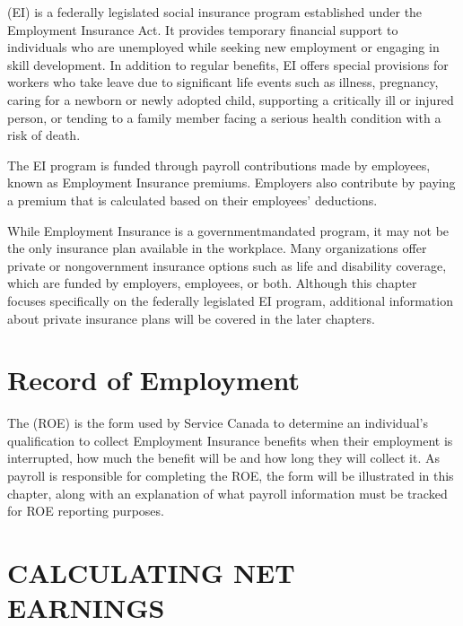 \documentclass[letterpaper,10pt,english]{sphinxmanual}
\begin{document}
\sphinxAtStartPar
{} (EI) is a federally legislated social insurance program established under the Employment Insurance Act.
It provides temporary financial support to individuals who are unemployed while seeking new employment or engaging in skill
development. In addition to regular benefits, EI offers special provisions for workers who take leave due to significant life
events such as illness, pregnancy, caring for a newborn or newly adopted child, supporting a critically ill or injured person,
or tending to a family member facing a serious health condition with a risk of death.

\sphinxAtStartPar
The EI program is funded through payroll contributions made by employees, known as Employment Insurance premiums. Employers
also contribute by paying a premium that is calculated based on their employees’ deductions.

\sphinxAtStartPar
While Employment Insurance is a government\sphinxhyphen{}mandated program, it may not be the only insurance plan available in the workplace.
Many organizations offer private or non\sphinxhyphen{}government insurance options such as life and disability coverage, which are funded by
employers, employees, or both. Although this chapter focuses specifically on the federally legislated EI program, additional
information about private insurance plans will be covered in the later chapters.


\chapter{Record of Employment}
\label{\detokenize{cpp-and-ei:record-of-employment}}
\sphinxAtStartPar
The  (ROE) is the form used by Service Canada to determine an individual’s qualification to collect
Employment Insurance benefits when their employment is interrupted, how much the benefit will be and how long they will
collect it. As payroll is responsible for completing the ROE, the form will be illustrated in this chapter, along with an
explanation of what payroll information must be tracked for ROE reporting purposes.

\sphinxstepscope


\chapter{CALCULATING NET EARNINGS}
\label{\detokenize{compensation:calculating-net-earnings}}\label{\detokenize{compensation::doc}}
\end{document}
